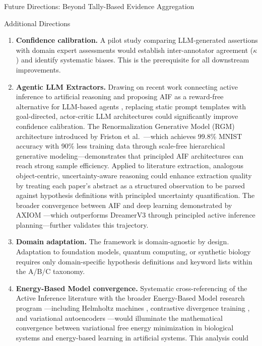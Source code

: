 \documentclass[
  ignorenonframetext,
]{beamer}
\begin{document}
\begin{frame}[fragile]{Future Directions: Beyond Tally-Based Evidence
Aggregation}
\begin{block}{Additional Directions}
\protect{}\label{additional-directions}
\begin{enumerate}
\item
  \textbf{Confidence calibration.} A pilot study comparing LLM-generated
  assertions with domain expert assessments would establish
  inter-annotator agreement (\(\kappa\)) and identify systematic biases.
  This is the prerequisite for all downstream improvements.
\item
  \textbf{Agentic LLM Extractors.} Drawing on recent work connecting
  active inference to artificial reasoning \citep{friston2025active} and
  proposing AIF as a reward-free alternative for LLM-based agents
  \citep{wen2025missing}, replacing static prompt templates with
  goal-directed, actor-critic LLM architectures could significantly
  improve confidence calibration. The Renormalization Generative Model
  (RGM) architecture introduced by Friston et
  al.~\citep{friston2025active}---which achieves 99.8\% MNIST accuracy
  with 90\% less training data through scale-free hierarchical
  generative modeling---demonstrates that principled AIF architectures
  can reach strong sample efficiency. Applied to literature extraction,
  analogous object-centric, uncertainty-aware reasoning could enhance
  extraction quality by treating each paper's abstract as a structured
  observation to be parsed against hypothesis definitions with
  principled uncertainty quantification. The broader convergence between
  AIF and deep learning demonstrated by AXIOM
  \citep{heins2025axiom}---which outperforms DreamerV3 through
  principled active inference planning---further validates this
  trajectory.
\item
  \textbf{Domain adaptation.} The framework is domain-agnostic by
  design. Adaptation to foundation models, quantum computing, or
  synthetic biology requires only domain-specific hypothesis definitions
  and keyword lists within the A/B/C taxonomy.
\item
  \textbf{Energy-Based Model convergence.} Systematic cross-referencing
  of the Active Inference literature with the broader Energy-Based Model
  research program \citep{lecun2006tutorial}---including Helmholtz
  machines \citep{dayan1995helmholtz}, contrastive divergence training
  \citep{hinton2002training}, and variational autoencoders
  \citep{kingma2014auto}---would illuminate the mathematical convergence
  between variational free energy minimization in biological systems and
  energy-based learning in artificial systems. This analysis could

\end{enumerate}
\end{block}
\end{frame}
\end{document}
